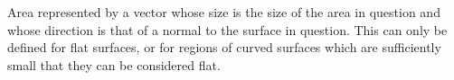 Area represented by a vector whose size is the size of the area in question and
whose direction is that of a normal to the surface in question. This can only
be defined for flat surfaces, or for regions of curved surfaces which are
sufficiently small that they can be considered flat.